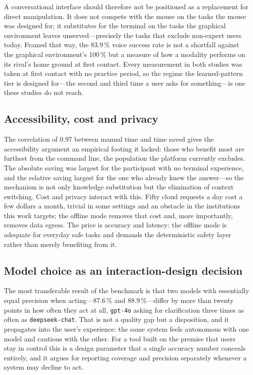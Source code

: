 \documentclass[10pt,a4paper]{article}
\begin{document}
A conversational interface should therefore not be positioned as a replacement for direct manipulation. It does not compete with the mouse on the tasks the mouse was designed for; it substitutes for the terminal on the tasks the graphical environment leaves unserved---precisely the tasks that exclude non-expert users today. Framed that way, the 83.9\,\% voice success rate is not a shortfall against the graphical environment's 100\,\% but a measure of how a modality performs on its rival's home ground at first contact. Every measurement in both studies was taken at first contact with no practice period, so the regime the learned-pattern tier is designed for---the second and third time a user asks for something---is one these studies do not reach.

\subsection{Accessibility, cost and privacy}
\label{subsec:implications}

The correlation of 0.97 between manual time and time saved gives the accessibility argument an empirical footing it lacked: those who benefit most are furthest from the command line, the population the platform currently excludes. The absolute saving was largest for the participant with no terminal experience, and the relative saving largest for the one who already knew the answer---so the mechanism is not only knowledge substitution but the elimination of context switching. Cost and privacy interact with this. Fifty cloud requests a day cost a few dollars a month, trivial in some settings and an obstacle in the institutions this work targets; the offline mode removes that cost and, more importantly, removes data egress. The price is accuracy and latency: the offline mode is adequate for everyday safe tasks and demands the deterministic safety layer rather than merely benefiting from it.

\subsection{Model choice as an interaction-design decision}
\label{subsec:model-choice}

The most transferable result of the benchmark is that two models with essentially equal precision when acting---87.6\,\% and 88.9\,\%---differ by more than twenty points in how often they act at all, \texttt{gpt-4o} asking for clarification three times as often as \texttt{deepseek-chat}. That is not a quality gap but a disposition, and it propagates into the user's experience: the same system feels autonomous with one model and cautious with the other. For a tool built on the premise that users stay in control this is a design parameter that a single accuracy number conceals entirely, and it argues for reporting coverage and precision separately whenever a system may decline to act.
\end{document}
